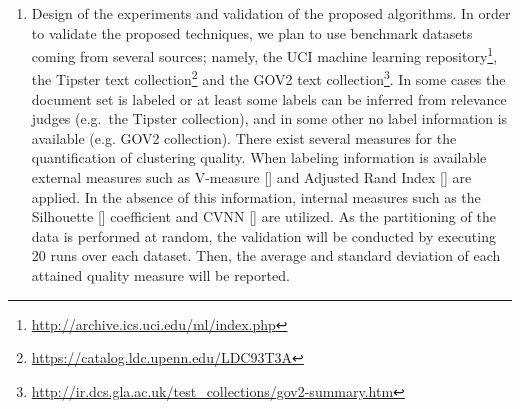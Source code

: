 \documentclass[10pt]{article}
\begin{document}
\begin{enumerate}
\item Design of the experiments and validation of the proposed algorithms. 
    In order to validate the proposed techniques, we plan to use benchmark datasets coming from several sources; namely, the UCI machine learning repository\footnote{\url{http://archive.ics.uci.edu/ml/index.php}}, the Tipster text collection\footnote{\url{https://catalog.ldc.upenn.edu/LDC93T3A}} and the GOV2 text collection\footnote{\url{http://ir.dcs.gla.ac.uk/test_collections/gov2-summary.htm}}. 
In some cases the document set is labeled or at least some labels can be inferred from relevance judges (e.g.\ the Tipster collection), and in some other no label information is available (e.g. GOV2 collection).
 There exist several measures for the quantification of clustering quality. When labeling information is available external measures such as V-measure [\cite{RH07}] and Adjusted Rand Index [\cite{HA85}] are applied. 
In the absence of this information, internal measures such as the Silhouette [\cite{R87}] coefficient and CVNN [\cite{LLXGWW13}] are utilized.
As the partitioning of the data is performed at random, the validation will be conducted by executing 20 runs over each dataset. Then, the average and standard deviation of each attained quality measure will be reported.

\end{enumerate}
\end{document}
